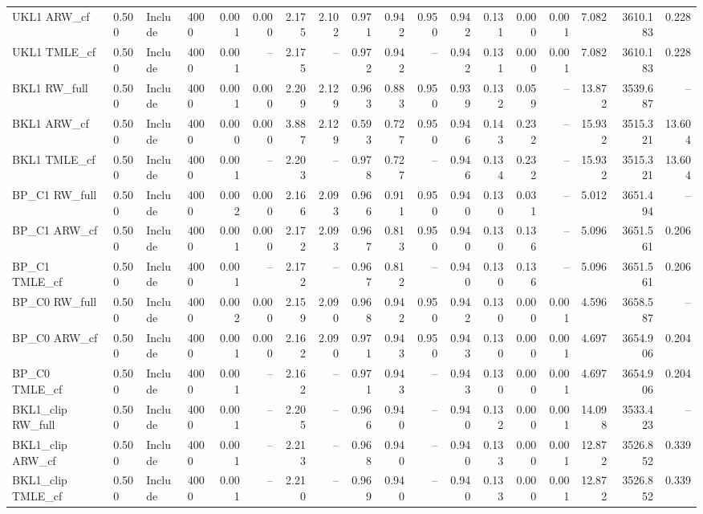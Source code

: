 \begin{tabular}{llllrrrrrrrrrrrrrr}
UKL1 ARW\_cf & 0.500 & Include & 4000 & 0.001 & 0.000 & 2.175 & 2.102 & 0.971 & 0.942 & 0.950 & 0.942 & 0.131 & 0.000 & 0.001 & 7.082 & 3610.183 & 0.228 \\
UKL1 TMLE\_cf & 0.500 & Include & 4000 & 0.001 & -- & 2.175 & -- & 0.972 & 0.942 & -- & 0.942 & 0.131 & 0.000 & 0.001 & 7.082 & 3610.183 & 0.228 \\
BKL1 RW\_full & 0.500 & Include & 4000 & 0.001 & 0.000 & 2.209 & 2.129 & 0.963 & 0.883 & 0.950 & 0.939 & 0.132 & 0.059 & -- & 13.872 & 3539.687 & -- \\
BKL1 ARW\_cf & 0.500 & Include & 4000 & 0.000 & 0.000 & 3.887 & 2.129 & 0.593 & 0.727 & 0.950 & 0.946 & 0.143 & 0.232 & -- & 15.932 & 3515.321 & 13.604 \\
BKL1 TMLE\_cf & 0.500 & Include & 4000 & 0.001 & -- & 2.203 & -- & 0.978 & 0.727 & -- & 0.946 & 0.134 & 0.232 & -- & 15.932 & 3515.321 & 13.604 \\
BP\_C1 RW\_full & 0.500 & Include & 4000 & 0.002 & 0.000 & 2.166 & 2.093 & 0.966 & 0.911 & 0.950 & 0.940 & 0.130 & 0.031 & -- & 5.012 & 3651.494 & -- \\
BP\_C1 ARW\_cf & 0.500 & Include & 4000 & 0.001 & 0.000 & 2.172 & 2.093 & 0.967 & 0.813 & 0.950 & 0.940 & 0.130 & 0.136 & -- & 5.096 & 3651.561 & 0.206 \\
BP\_C1 TMLE\_cf & 0.500 & Include & 4000 & 0.001 & -- & 2.172 & -- & 0.967 & 0.812 & -- & 0.940 & 0.130 & 0.136 & -- & 5.096 & 3651.561 & 0.206 \\
BP\_C0 RW\_full & 0.500 & Include & 4000 & 0.002 & 0.000 & 2.159 & 2.090 & 0.968 & 0.942 & 0.950 & 0.942 & 0.130 & 0.000 & 0.001 & 4.596 & 3658.587 & -- \\
BP\_C0 ARW\_cf & 0.500 & Include & 4000 & 0.001 & 0.000 & 2.162 & 2.090 & 0.971 & 0.943 & 0.950 & 0.943 & 0.130 & 0.000 & 0.001 & 4.697 & 3654.906 & 0.204 \\
BP\_C0 TMLE\_cf & 0.500 & Include & 4000 & 0.001 & -- & 2.162 & -- & 0.971 & 0.943 & -- & 0.943 & 0.130 & 0.000 & 0.001 & 4.697 & 3654.906 & 0.204 \\
BKL1\_clip RW\_full & 0.500 & Include & 4000 & 0.001 & -- & 2.205 & -- & 0.966 & 0.940 & -- & 0.940 & 0.132 & 0.000 & 0.001 & 14.098 & 3533.423 & -- \\
BKL1\_clip ARW\_cf & 0.500 & Include & 4000 & 0.001 & -- & 2.213 & -- & 0.968 & 0.940 & -- & 0.940 & 0.133 & 0.000 & 0.001 & 12.872 & 3526.852 & 0.339 \\
BKL1\_clip TMLE\_cf & 0.500 & Include & 4000 & 0.001 & -- & 2.210 & -- & 0.969 & 0.940 & -- & 0.940 & 0.133 & 0.000 & 0.001 & 12.872 & 3526.852 & 0.339 \\

\end{tabular}
